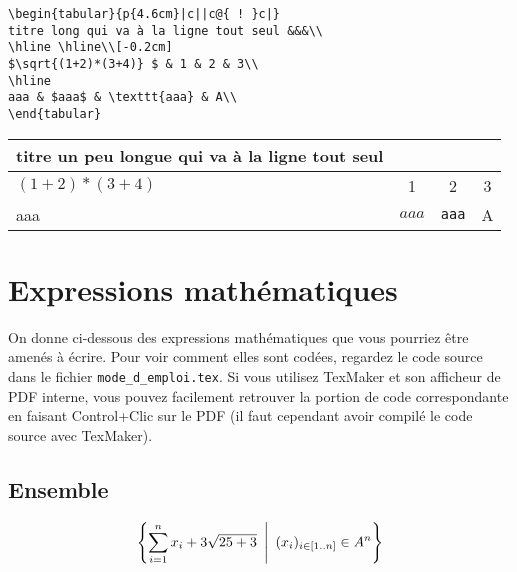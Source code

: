 \documentclass[12pt,a4paper,fleqn]{article}
\begin{document}
\noindent
\begin{minipage}{0.54\textwidth}
\begin{verbatim}
\begin{tabular}{p{4.6cm}|c||c@{ ! }c|}
titre long qui va à la ligne tout seul &&&\\
\hline \hline\\[-0.2cm]
$\sqrt{(1+2)*(3+4)} $ & 1 & 2 & 3\\
\hline
aaa & $aaa$ & \texttt{aaa} & A\\
\end{tabular}
\end{verbatim}
\end{minipage}
\hspace*{0.1cm}\color{expli}\vrule \color{black}\hspace*{0.1cm}
\begin{minipage}{0.46\textwidth}
\begin{tabular}{p{4.6cm}|c||c@{ ! }c|}
titre un peu longue qui va à la ligne tout seul &&&\\
\hline \hline
${(1+2)*(3+4)} $ & 1 & 2 & 3\\
\hline
aaa & $aaa$ & \texttt{aaa} & A\\
\end{tabular}
\end{minipage}

\vspace*{-0.2cm}

\newpage
\section{Expressions mathématiques}
On donne ci-dessous des expressions mathématiques 
que vous pourriez être amenés à écrire.
Pour voir comment elles sont codées,
regardez le code source dans le fichier \texttt{mode\_d\_emploi.tex}.
Si vous utilisez TexMaker et  son afficheur de PDF interne,
vous pouvez facilement retrouver la portion de code correspondante
en faisant \textsf{Control+Clic} sur le PDF 
(il faut cependant avoir compilé le code source avec TexMaker).

\subsection{Ensemble}
$$\left\lbrace 
\sum_{i=1}^n x_i + 3 \sqrt{25+3}
\enskip \middle| \enskip
(x_i)_{i\in[1..n] } \in A^n
\right\rbrace$$
\end{document}
